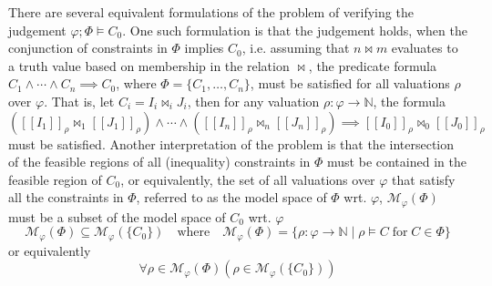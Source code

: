 There are several equivalent formulations of the problem of verifying the judgement $\varphi;\Phi\vDash C_0$. One such formulation is that the judgement holds, when the conjunction of constraints in $\Phi$ implies $C_0$, i.e. assuming that $n \bowtie m$ evaluates to a truth value based on membership in the relation $\bowtie$, the predicate formula $C_1 \land \cdots \land C_n \implies C_0$, where $\Phi = \{C_1,\dots,C_n\}$, must be satisfied for all valuations $\rho$ over $\varphi$. That is, let $C_i = I_i \bowtie_i J_i$, then for any valuation $\rho : \varphi \rightarrow \mathbb{N}$, the formula $([\![I_1]\!]_\rho \bowtie_1 [\![J_1]\!]_\rho) \land \cdots \land ([\![I_n]\!]_\rho \bowtie_n [\![J_n]\!]_\rho) \implies [\![I_0]\!]_\rho \bowtie_0 [\![J_0]\!]_\rho$ must be satisfied. Another interpretation of the problem is that the intersection of the feasible regions of all (inequality) constraints in $\Phi$ must be contained in the feasible region of $C_0$, or equivalently, the set of all valuations over $\varphi$ that satisfy all the constraints in $\Phi$, referred to as the model space of $\Phi$ wrt. $\varphi$, $\mathcal{M}_\varphi(\Phi)$ must be a subset of the model space of $C_0$ wrt. $\varphi$ \begin{equation*}
    \mathcal{M}_\varphi(\Phi) \subseteq \mathcal{M}_\varphi(\{C_0\})\quad\text{where}\quad\mathcal{M}_\varphi(\Phi)=\{\rho : \varphi \rightarrow \mathbb{N} \mid \rho \vDash C\;\text{for}\; C \in \Phi\}
\end{equation*}
or equivalently
\begin{equation*}
    \forall \rho \in \mathcal{M}_\varphi(\Phi) (\rho \in \mathcal{M}_\varphi(\{C_0\}))
\end{equation*}

